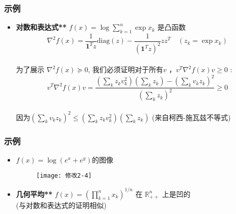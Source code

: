 \documentclass[handout,10pt]{beamer}
\begin{document}
\begin{frame}
	\frametitle{示例}

\begin{itemize}[<+->]
  \item \textbf{对数和表达式**} $f(x)=\log \sum_{k=1}^{n} \exp x_{k}$ 是凸函数
	\begin{equation}
		\nabla^{2} f(x)=\frac{1}{\mathbf{1}^{T} z} \text{diag}(z)-\frac{1}{\left(\mathbf{1}^{T} z\right)^{2}} z z^{T} \quad\left(z_{k}=\exp x_{k}\right)
	\end{equation}\\
	\bigskip
    为了展示 $\nabla^{2} f(x) \succeq 0$, 我们必须证明对于所有$v$ ，$v^{T} \nabla^{2} f(x) v \geq 0$  :
    \begin{equation}
    	v^{T} \nabla^{2} f(x) v=\frac{\left(\sum_{k} z_{k} v_{k}^{2}\right)\left(\sum_{k} z_{k}\right)-\left(\sum_{k} v_{k} z_{k}\right)^{2}}{\left(\sum_{k} z_{k}\right)^{2}} \geq 0
    \end{equation}\\
    \bigskip
    因为$\left(\sum_{k} v_{k} z_{k}\right)^{2} \leq\left(\sum_{k} z_{k} v_{k}^{2}\right)\left(\sum_{k} z_{k}\right)$ (来自柯西-施瓦兹不等式)\\
    \end{itemize}
\end{frame}
\begin{frame}
	\frametitle{示例}
	\begin{itemize}[<+->]
		\item $f(x)=\log (e^{x}+e^{y})$的图像
	

    \begin{figure}
    	\centering
    	\texttt{[image: 修改2-4]}
    \end{figure}

   \item \textbf{几何平均** } $f(x)=\left(\prod_{k=1}^{n} x_{k}\right)^{1 / n}$ 在 $\mathbb{R}_{++}^{n}$ 上是凹的\\
    (与对数和表达式的证明相似)
\end{itemize}
	


\end{frame}
\end{document}
